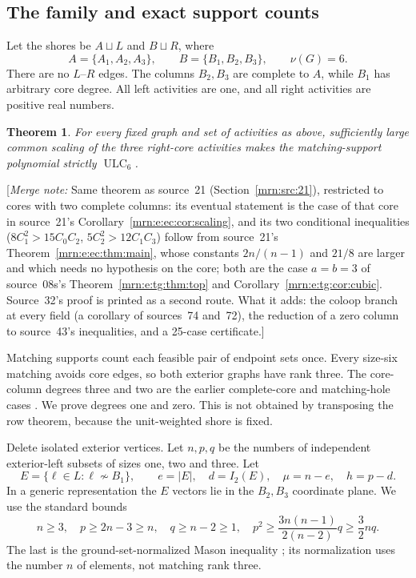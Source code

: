 \documentclass[11pt,a4paper]{article}
\newtheorem{theorem}{Theorem}[section]
\theoremstyle{remark}\newtheorem{remark}[theorem]{Remark}
\newcommand{\ULC}{\operatorname{ULC}}      %
\newcommand{\mnote}[1]{[\textit{Merge note:} #1]}
\begin{document}
\subsection{The family and exact support counts}
Let the shores be $A\sqcup L$ and $B\sqcup R$, where
\[
 A=\{A_1,A_2,A_3\},\qquad B=\{B_1,B_2,B_3\},\qquad \nu(G)=6.
\]
There are no $L$--$R$ edges. The columns $B_2,B_3$ are complete to $A$, while $B_1$ has arbitrary core degree. All left activities are one, and all right activities are positive real numbers.

\begin{theorem}\label{mrn:e:tc:thm:main}
For every fixed graph and set of activities as above, sufficiently large common scaling of the three right-core activities makes the matching-support polynomial strictly $\ULC_6$.
\end{theorem}
\mnote{Same theorem as source~21 (Section~\ref{mrn:src:21}), restricted to cores with two complete columns: its eventual statement is the case of that core in source~21's Corollary~\ref{mrn:e:ec:cor:scaling}, and its two conditional inequalities ($8C_1^2>15C_0C_2$, $5C_2^2>12C_1C_3$) follow from source~21's Theorem~\ref{mrn:e:ec:thm:main}, whose constants $2n/(n-1)$ and $21/8$ are larger and which needs no hypothesis on the core; both are the case $a=b=3$ of source~08s's Theorem~\ref{mrn:e:tg:thm:top} and Corollary~\ref{mrn:e:tg:cor:cubic}. Source~32's proof is printed as a second route. What it adds: the coloop branch at every field (a corollary of sources~74 and~72), the reduction of a zero column to source~43's inequalities, and a 25-case certificate.}

Matching supports count each feasible pair of endpoint sets once. Every size-six matching avoids core edges, so both exterior graphs have rank three. The core-column degrees three and two are the earlier complete-core and matching-hole cases \cite{b:m43,b:m38}. We prove degrees one and zero. This is not obtained by transposing the row theorem, because the unit-weighted shore is fixed.

Delete isolated exterior vertices. Let $n,p,q$ be the numbers of independent exterior-left subsets of sizes one, two and three. Let
\[
 E=\{\ell\in L:\ell\not\sim B_1\},\qquad
 e=|E|,\quad d=I_2(E),\quad \mu=n-e,\quad h=p-d.
\]
In a generic representation the $E$ vectors lie in the $B_2,B_3$ coordinate plane. We use the standard bounds
\begin{equation}\label{mrn:e:tc:eq:basic}
 n\ge3,\quad p\ge2n-3\ge n,\quad q\ge n-2\ge1,\quad
 p^2\ge\frac{3n(n-1)}{2(n-2)}q\ge\frac32nq.
\end{equation}
The last is the ground-set-normalized Mason inequality \cite[Theorem 4.14]{b:BH}; its normalization uses the number $n$ of elements, not matching rank three.
\end{document}
